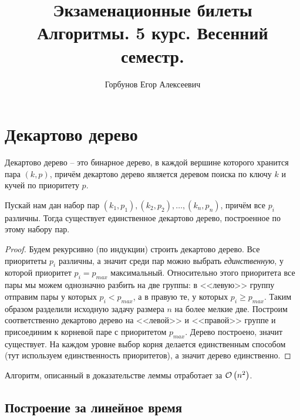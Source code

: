 

\makeatletter
{}
\makeatother
\graphicspath{{./figs/}}

\title{Экзаменационные билеты \\ Алгоритмы. 5 курс. Весенний семестр.}
\author{Горбунов Егор Алексеевич}


\maketitle

\section{Декартово дерево}
\begin{defn}
Декартово дерево -- это бинарное дерево, в каждой вершине которого хранится пара $(k, p)$, причём декартово дерево является деревом поиска по ключу $k$ и кучей по приоритету $p$.
\end{defn}

\begin{lem}
Пускай нам дан набор пар $(k_1, p_1), (k_2, p_2), \ldots, (k_n, p_n)$, причём все $p_i$ различны. Тогда существует единственное декартово дерево, построенное по этому набору пар.
\end{lem}
\begin{proof}
Будем рекурсивно (по индукции) строить декартово дерево. Все приоритеты $p_i$ различны, а значит среди пар можно выбрать \emph{единственную}, у которой приоритет $p_i = p_{max}$ максимальный. Относительно этого приоритета все пары мы можем однозначно разбить на две группы: в <<левую>> группу отправим пары у которых $p_i < p_{max}$, а в правую те, у которых $p_i \geq p_{max}$.
Таким образом разделили исходную задачу размера $n$ на более мелкие две. Построим соответственно декартово дерево на <<левой>> и <<правой>> группе и присоединим к корневой паре с приоритетом $p_{max}$. Дерево построено, значит существует. На каждом уровне выбор корня делается единственным способом (тут используем единственность приоритетов), а значит дерево единственно.
\end{proof}

\begin{note}
Алгоритм, описанный в доказательстве леммы отработает за $\mathcal{O}\left(n^2\right)$.
\end{note}

\subsection{Построение за линейное время}

